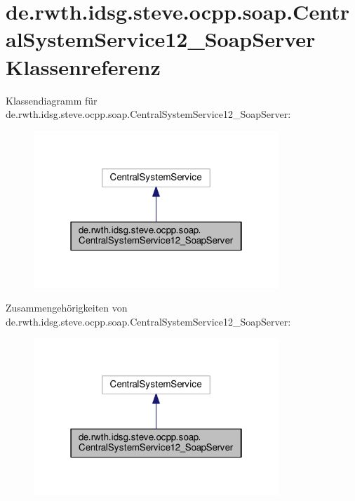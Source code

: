 \hypertarget{classde_1_1rwth_1_1idsg_1_1steve_1_1ocpp_1_1soap_1_1_central_system_service12___soap_server}{\section{de.\-rwth.\-idsg.\-steve.\-ocpp.\-soap.\-Central\-System\-Service12\-\_\-\-Soap\-Server Klassenreferenz}
\label{classde_1_1rwth_1_1idsg_1_1steve_1_1ocpp_1_1soap_1_1_central_system_service12___soap_server}
}


Klassendiagramm für de.\-rwth.\-idsg.\-steve.\-ocpp.\-soap.\-Central\-System\-Service12\-\_\-\-Soap\-Server\-:
\nopagebreak
\begin{figure}[H]
\begin{center}
\leavevmode
\includegraphics[width=262pt]{classde_1_1rwth_1_1idsg_1_1steve_1_1ocpp_1_1soap_1_1_central_system_service12___soap_server__inherit__graph}
\end{center}
\end{figure}


Zusammengehörigkeiten von de.\-rwth.\-idsg.\-steve.\-ocpp.\-soap.\-Central\-System\-Service12\-\_\-\-Soap\-Server\-:
\nopagebreak
\begin{figure}[H]
\begin{center}
\leavevmode
\includegraphics[width=262pt]{classde_1_1rwth_1_1idsg_1_1steve_1_1ocpp_1_1soap_1_1_central_system_service12___soap_server__coll__graph}
\end{center}
\end{figure}
